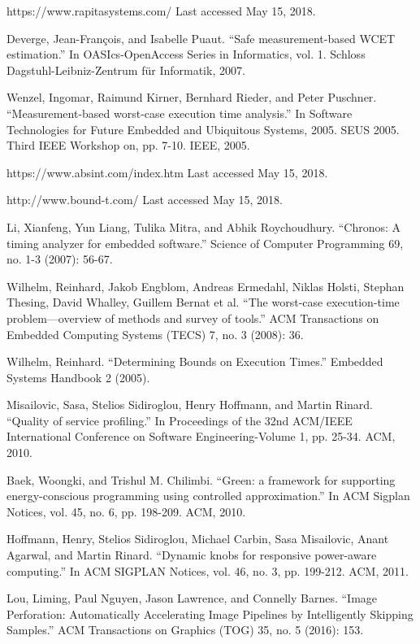 
\begin{thebibliography}{}
  https://www.rapitasystems.com/
  Last accessed May 15, 2018.
 
  Deverge, Jean-François, and Isabelle Puaut. ``Safe measurement-based WCET estimation.'' In OASIcs-OpenAccess Series in Informatics, vol. 1. Schloss Dagstuhl-Leibniz-Zentrum für Informatik, 2007.  

  Wenzel, Ingomar, Raimund Kirner, Bernhard Rieder, and Peter Puschner. ``Measurement-based worst-case execution time analysis.'' In Software Technologies for Future Embedded and Ubiquitous Systems, 2005. SEUS 2005. Third IEEE Workshop on, pp. 7-10. IEEE, 2005.
  
  https://www.absint.com/index.htm
  Last accessed May 15, 2018.

  http://www.bound-t.com/
  Last accessed May 15, 2018.
  
  Li, Xianfeng, Yun Liang, Tulika Mitra, and Abhik Roychoudhury. ``Chronos: A timing analyzer for embedded software.'' Science of Computer Programming 69, no. 1-3 (2007): 56-67.

  Wilhelm, Reinhard, Jakob Engblom, Andreas Ermedahl, Niklas Holsti, Stephan Thesing, David Whalley, Guillem Bernat et al. ``The worst-case execution-time problem—overview of methods and survey of tools.'' ACM Transactions on Embedded Computing Systems (TECS) 7, no. 3 (2008): 36.
  
  Wilhelm, Reinhard. ``Determining Bounds on Execution Times.'' Embedded Systems Handbook 2 (2005).

  Misailovic, Sasa, Stelios Sidiroglou, Henry Hoffmann, and Martin Rinard. ``Quality of service profiling.'' In Proceedings of the 32nd ACM/IEEE International Conference on Software Engineering-Volume 1, pp. 25-34. ACM, 2010.

  Baek, Woongki, and Trishul M. Chilimbi. ``Green: a framework for supporting energy-conscious programming using controlled approximation.'' In ACM Sigplan Notices, vol. 45, no. 6, pp. 198-209. ACM, 2010.

  Hoffmann, Henry, Stelios Sidiroglou, Michael Carbin, Sasa Misailovic, Anant Agarwal, and Martin Rinard. ``Dynamic knobs for responsive power-aware computing.'' In ACM SIGPLAN Notices, vol. 46, no. 3, pp. 199-212. ACM, 2011.

  Lou, Liming, Paul Nguyen, Jason Lawrence, and Connelly Barnes. ``Image Perforation: Automatically Accelerating Image Pipelines by Intelligently Skipping Samples.'' ACM Transactions on Graphics (TOG) 35, no. 5 (2016): 153.


\end{thebibliography}
